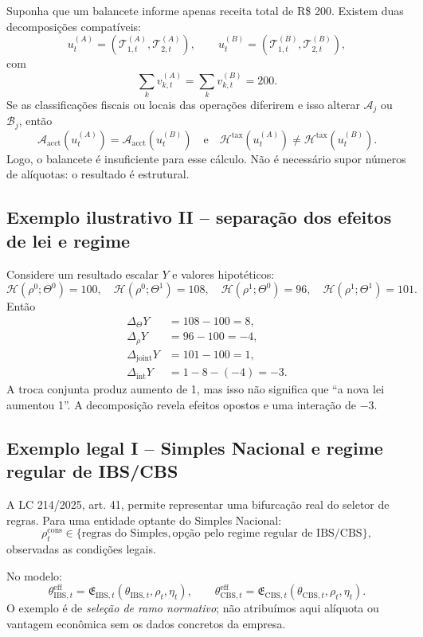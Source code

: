 \documentclass[11pt,a4paper]{article}
\newcommand{\CBS}{\mathrm{CBS}}
\newcommand{\IBS}{\mathrm{IBS}}
\newcommand{\cT}{\mathcal{T}}
\newcommand{\cB}{\mathcal{B}}
\newcommand{\cA}{\mathcal{A}}
\newcommand{\cH}{\mathcal{H}}
\begin{document}
Suponha que um balancete informe apenas receita total de R\$ 200. Existem duas decomposições compatíveis:
\[
u_t^{(A)}=(\cT_{1,t}^{(A)},\cT_{2,t}^{(A)}),
\qquad
u_t^{(B)}=(\cT_{1,t}^{(B)},\cT_{2,t}^{(B)}),
\]
com
\[
\sum_k v_{k,t}^{(A)}=\sum_k v_{k,t}^{(B)}=200.
\]
Se as classificações fiscais ou locais das operações diferirem e isso alterar $\cA_j$ ou $\cB_j$, então
\[
\mathcal A_{\mathrm{acct}}(u_t^{(A)})
=\mathcal A_{\mathrm{acct}}(u_t^{(B)})
\quad\text{e}\quad
\cH^{\mathrm{tax}}(u_t^{(A)})\neq\cH^{\mathrm{tax}}(u_t^{(B)}).
\]
Logo, o balancete é insuficiente para esse cálculo. Não é necessário supor números de alíquotas: o resultado é estrutural.

\subsection{Exemplo ilustrativo II -- separação dos efeitos de lei e regime}

Considere um resultado escalar $Y$ e valores hipotéticos:
\[
\cH(\rho^0;\Theta^0)=100,
\quad
\cH(\rho^0;\Theta^1)=108,
\quad
\cH(\rho^1;\Theta^0)=96,
\quad
\cH(\rho^1;\Theta^1)=101.
\]
Então
\begin{align*}
\Delta_{\Theta}Y&=108-100=8,\\
\Delta_{\rho}Y&=96-100=-4,\\
\Delta_{\mathrm{joint}}Y&=101-100=1,\\
\Delta_{\mathrm{int}}Y&=1-8-(-4)=-3.
\end{align*}
A troca conjunta produz aumento de 1, mas isso não significa que ``a nova lei aumentou 1''. A decomposição revela efeitos opostos e uma interação de $-3$.

\subsection{Exemplo legal I -- Simples Nacional e regime regular de IBS/CBS}

A LC 214/2025, art. 41, permite representar uma bifurcação real do seletor de regras. Para uma entidade optante do Simples Nacional:
\[
\rho_t^{\mathrm{cons}}
\in
\{\text{regras do Simples},\text{opção pelo regime regular de IBS/CBS}\},
\]
observadas as condições legais.

No modelo:
\[
\theta_{\IBS,t}^{\mathrm{eff}}
=\mathfrak E_{\IBS,t}(\theta_{\IBS,t},\rho_t,\eta_t),
\qquad
\theta_{\CBS,t}^{\mathrm{eff}}
=\mathfrak E_{\CBS,t}(\theta_{\CBS,t},\rho_t,\eta_t).
\]
O exemplo é de \emph{seleção de ramo normativo}; não atribuímos aqui alíquota ou vantagem econômica sem os dados concretos da empresa.
\end{document}
